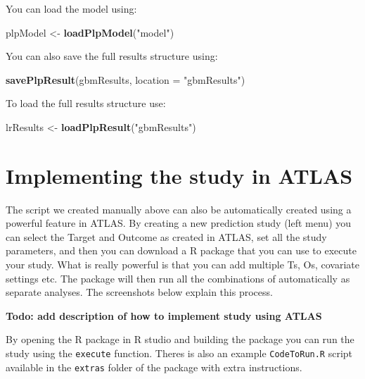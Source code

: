 \documentclass[11pt]{book}
\newenvironment{Shaded}{\begin{snugshade}}{\end{snugshade}}
\newcommand{\KeywordTok}[1]{\textcolor[rgb]{0.13,0.29,0.53}{\textbf{#1}}}
\newcommand{\DataTypeTok}[1]{\textcolor[rgb]{0.13,0.29,0.53}{#1}}
\newcommand{\StringTok}[1]{\textcolor[rgb]{0.31,0.60,0.02}{#1}}
\newcommand{\NormalTok}[1]{#1}
\begin{document}
You can load the model using:

\begin{Shaded}
\begin{Highlighting}[]
\NormalTok{plpModel <-}\StringTok{ }\KeywordTok{loadPlpModel}\NormalTok{(}\StringTok{"model"}\NormalTok{)}
\end{Highlighting}
\end{Shaded}

You can also save the full results structure using:

\begin{Shaded}
\begin{Highlighting}[]
\KeywordTok{savePlpResult}\NormalTok{(gbmResults, }\DataTypeTok{location =} \StringTok{"gbmResults"}\NormalTok{)}
\end{Highlighting}
\end{Shaded}

To load the full results structure use:

\begin{Shaded}
\begin{Highlighting}[]
\NormalTok{lrResults <-}\StringTok{ }\KeywordTok{loadPlpResult}\NormalTok{(}\StringTok{"gbmResults"}\NormalTok{)}
\end{Highlighting}
\end{Shaded}

\section{Implementing the study in
ATLAS}\label{implementing-the-study-in-atlas}

The script we created manually above can also be automatically created
using a powerful feature in ATLAS. By creating a new prediction study
(left menu) you can select the Target and Outcome as created in ATLAS,
set all the study parameters, and then you can download a R package that
you can use to execute your study. What is really powerful is that you
can add multiple Ts, Os, covariate settings etc. The package will then
run all the combinations of automatically as separate analyses. The
screenshots below explain this process.

\textbf{Todo: add description of how to implement study using ATLAS}

By opening the R package in R studio and building the package you can
run the study using the \texttt{execute} function. Theres is also an
example \texttt{CodeToRun.R} script available in the \texttt{extras}
folder of the package with extra instructions.
\end{document}
